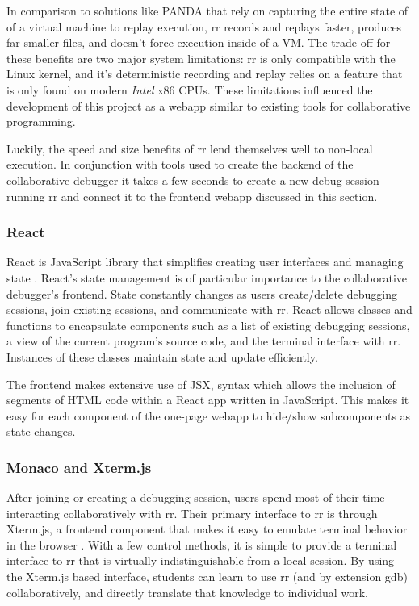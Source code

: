 \documentclass[12pt]{article}
\begin{document}
In comparison to solutions like PANDA\cite{10.1145/2843859.2843867}
that rely on capturing the entire state of of a virtual machine to
replay execution, rr records and replays faster, produces far smaller
files, and doesn't force execution inside of a
VM.\cite{DBLP:journals/corr/OCallahanJFHNP17} The trade off for these
benefits are two major system limitations: rr is only compatible with
the Linux kernel, and it's deterministic recording and replay relies
on a feature that is only found on modern \textit{Intel} x86 CPUs.
These limitations influenced the development of this project as a
webapp similar to existing tools for collaborative programming.
\par

Luckily, the speed and size benefits of rr lend themselves well to
non-local execution.  In conjunction with tools used to create the
backend of the collaborative debugger it takes a few seconds to create
a new debug session running rr and connect it to the frontend webapp
discussed in this section.

\subsubsection{React}\label{react}

React is JavaScript library that simplifies creating user interfaces
and managing state \cite{react}.  React's state management is of
particular importance to the collaborative debugger's frontend.  State
constantly changes as users create/delete debugging sessions, join
existing sessions, and communicate with rr.  React allows classes and
functions to encapsulate components such as a list of existing
debugging sessions, a view of the current program's source code, and
the terminal interface with rr.  Instances of these classes maintain
state and update efficiently.
\par

The frontend makes extensive use of JSX, syntax which allows the
inclusion of segments of HTML code within a React app written in
JavaScript.  This makes it easy for each component of the one-page
webapp to hide/show subcomponents as state changes.

\subsubsection{Monaco and Xterm.js}\label{xtermjs/monaco}

After joining or creating a debugging session, users spend most of
their time interacting collaboratively with rr.  Their primary
interface to rr is through Xterm.js, a frontend component that makes
it easy to emulate terminal behavior in the browser \cite{xtermjs}.
With a few control methods, it is simple to provide a terminal
interface to rr that is virtually indistinguishable from a local
session.  By using the Xterm.js based interface, students can learn to
use rr (and by extension gdb) collaboratively, and directly translate
that knowledge to individual work.
\par
\end{document}
